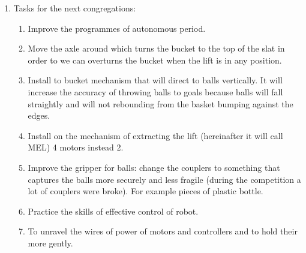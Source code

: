 \begin{enumerate}
\begin{enumerate}
  \end{enumerate}
  
  \item Tasks for the next congregations:
  \begin{enumerate}
  	\item Improve the programmes of autonomous period.
  	
  	\item Move the axle around which turns the bucket to the top of the slat in order to we can overturns the bucket when the lift is in any position.
  	
  	\item Install to bucket mechanism that will direct to balls vertically. It will increase the accuracy of throwing balls to goals because balls will fall straightly and will not rebounding from the basket bumping against the edges.
  	
  	\item Install on the mechanism of extracting the lift (hereinafter it will call MEL)  4 motors instead 2.
  	
  	\item Improve the gripper for balls: change the couplers to something that captures the balls more securely and less fragile (during the competition a lot of couplers were broke). For example pieces of plastic bottle.
  	
  	\item Practice the skills of effective control of robot.
  	
  	\item To unravel the wires of power of motors and controllers and to hold their more gently.
  	
  \end{enumerate}
  
\end{enumerate}
\fillpage